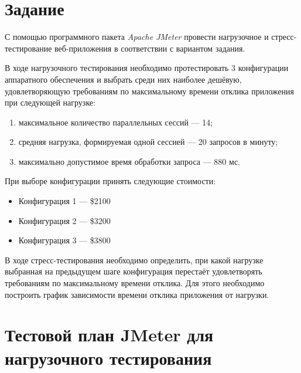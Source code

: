 \documentclass[listings]{labreport}
\begin{document}
\maketitlepage

\section*{Задание}

С помощью программного пакета \textit{Apache JMeter} провести нагрузочное и
стресс-тестирование веб-приложения в соответствии с вариантом задания.

В ходе нагрузочного тестирования необходимо протестировать 3 конфигурации
аппаратного обеспечения и выбрать среди них наиболее дешёвую, удовлетворяющую
требованиям по максимальному времени отклика приложения при следующей нагрузке:
\begin{enumerate}[noitemsep,topsep=0em]
\item максимальное количество параллельных сессий — 14;
\item средняя нагрузка, формируемая одной сессией — 20 запросов в минуту;
\item максимально допустимое время обработки запроса — 880 мс.
\end{enumerate}
\vspace{0.4em}

При выборе конфигурации принять следующие стоимости:
\begin{itemize}[noitemsep,topsep=0em]
\item Конфигурация 1 — \$2100
\item Конфигурация 2 — \$3200
\item Конфигурация 3 — \$3800
\end{itemize}

В ходе стресс-тестирования необходимо определить, при какой нагрузке
выбранная на предыдущем шаге конфигурация перестаёт удовлетворять требованиям
по максимальному времени отклика. Для этого необходимо построить график зависимости
времени отклика приложения от нагрузки.

\section*{Тестовой план JMeter для нагрузочного тестирования}
\end{document}
